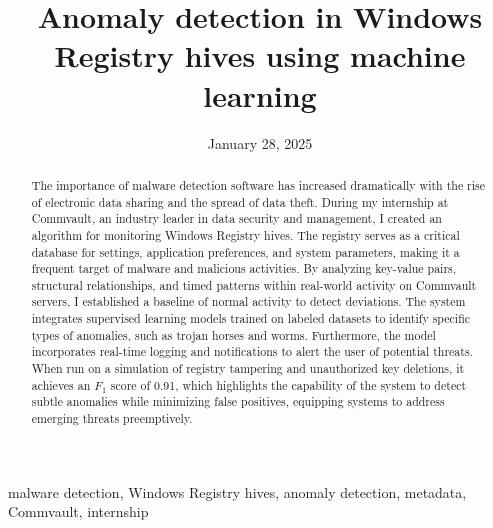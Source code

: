 ﻿\documentclass[12pt,conference,onecolumn]{IEEEtran}
\title{Anomaly detection in Windows Registry hives using machine learning}
\author{%
\IEEEauthorblockN{Krish Patel}\IEEEauthorblockA{Science \& Engineering\\Manalapan High School\\Englishtown, NJ\\425kpatel@frhsd.com}}
\date{January 28, 2025}
\newcommand{\keywords}{malware detection, Windows Registry hives, anomaly detection, metadata, Commvault, internship}
\begin{document}
\maketitle 

\begin{abstract}
The importance of malware detection software has increased dramatically with the rise of electronic data sharing and the spread of data theft. During my internship at Commvault, an industry leader in data security and management, I created an algorithm for monitoring Windows Registry hives. The registry serves as a critical database for settings, application preferences, and system parameters, making it a frequent target of malware and malicious activities. By analyzing key-value pairs, structural relationships, and timed patterns within real-world activity on Commvault servers, I established a baseline of normal activity to detect deviations. The system integrates supervised learning models trained on labeled datasets to identify specific types of anomalies, such as trojan horses and worms. Furthermore, the model incorporates real-time logging and notifications to alert the user of potential threats. When run on a simulation of registry tampering and unauthorized key deletions, it achieves an $F_1$ score of 0.91, which highlights the capability of the system to detect subtle anomalies while minimizing false positives, equipping systems to address emerging threats preemptively.
\end{abstract}

\begin{IEEEkeywords}
\keywords
\end{IEEEkeywords}
\end{document}
